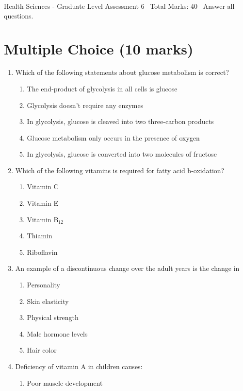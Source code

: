 \documentclass[12pt]{article}
\begin{document}
\begin{center}
Health Sciences - Graduate Level Assessment 6 \
Total Marks: 40 \
Answer all questions.
\end{center}

\section*{Multiple Choice (10 marks)}
\begin{enumerate}[label=\arabic*.]
\item Which of the following statements about glucose metabolism is correct?
\begin{enumerate}[label=(\alph*)]
    \item The end-product of glycolysis in all cells is glucose
    \item Glycolysis doesn't require any enzymes
    \item In glycolysis, glucose is cleaved into two three-carbon products
    \item Glucose metabolism only occurs in the presence of oxygen
    \item In glycolysis, glucose is converted into two molecules of fructose
\end{enumerate}
\item Which of the following vitamins is required for fatty acid b-oxidation?
\begin{enumerate}[label=(\alph*)]
    \item Vitamin C
    \item Vitamin E
    \item Vitamin B$_{12}$
    \item Thiamin
    \item Riboflavin
\end{enumerate}
\item An example of a discontinuous change over the adult years is the change in
\begin{enumerate}[label=(\alph*)]
    \item Personality
    \item Skin elasticity
    \item Physical strength
    \item Male hormone levels
    \item Hair color
\end{enumerate}
\item Deficiency of vitamin A in children causes:
\begin{enumerate}[label=(\alph*)]
    \item Poor muscle development

\end{enumerate}
\end{enumerate}
\end{document}
